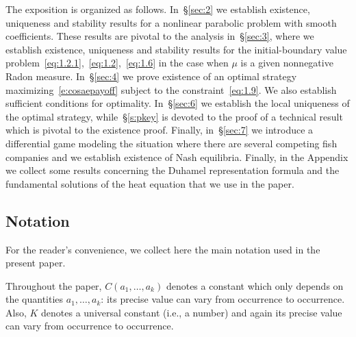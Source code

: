 \documentclass[11pt,leqno]{amsart}
\numberwithin{equation}{section}
\begin{document}
The exposition is organized as follows. In~\S\ref{sec:2} we establish existence, uniqueness and stability results for a nonlinear parabolic problem with smooth coefficients. These results are pivotal to the analysis in~\S\ref{sec:3}, where we establish existence, uniqueness and stability results for the initial-boundary value problem~\eqref{eq:1.2.1},~\eqref{eq:1.2},~\eqref{eq:1.6} in the case when $\mu$ is a given nonnegative Radon measure. In~\S\ref{sec:4} we prove existence of an optimal strategy 
maximizing~\eqref{e:cosaepayoff} subject to the constraint~\eqref{eq:1.9}. We also establish sufficient conditions for optimality. In~\S\ref{sec:6} we establish the local uniqueness of the optimal strategy, while~\S\ref{s:pkey} is devoted to the proof of a technical result which is pivotal to the existence proof. Finally, in~\S\ref{sec:7} we introduce a differential game modeling the situation where there are several competing fish companies and we establish existence of Nash equilibria. Finally, in the Appendix we collect some results concerning the Duhamel representation formula and the fundamental solutions of the heat equation that we use in the paper.  
\subsection*{Notation}
For the reader's convenience, we collect here the main notation used in the present paper. 

Throughout the paper, $C(a_1, \dots, a_k)$ denotes a constant which only depends on the quantities $a_1, \dots, a_k$: its precise value can vary from occurrence to occurrence. Also, $K$ denotes a universal constant (i.e., a number) and again its precise value can vary from occurrence to occurrence.
\end{document}
